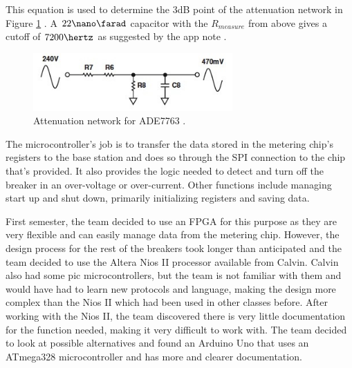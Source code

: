 This equation is used to determine the 3dB point of the attenuation network in Figure \ref{fig:attenuation_network} \cite{AN564}. A $22\nano\farad$ capacitor with the $R_{measure}$ from above gives a cutoff of $7200\hertz$ as suggested by the app note \cite{AN564}. 

\begin{figure}[htbp]
\begin{center}
\includegraphics[width=3in]{includes/NJAttenuationNetwork} 
\caption{Attenuation network for ADE7763 \cite{AN564}.}
\label{fig:attenuation_network} 
\end{center}
\end{figure}

The microcontroller's job is to transfer the data stored in the metering chip's registers to the base station and does so through the SPI connection to the chip that's provided. It also provides the logic needed to detect and turn off the breaker in an over-voltage or over-current.  Other functions include managing start up and shut down, primarily initializing registers and saving data. 

First semester, the team decided to use an FPGA for this purpose as they are very flexible and can easily manage data from the metering chip. However, the design process for the rest of the breakers took longer than anticipated and the team decided to use the Altera Nios II processor available from Calvin. Calvin also had some pic microcontrollers, but the team is not familiar with them and would have had to learn new protocols and language, making the design more complex than the Nios II which had been used in other classes before. After working with the Nios II, the team discovered there is very little documentation for the function needed, making it very difficult to work with. The team decided to look at possible alternatives and found an Arduino Uno that uses an ATmega328 microcontroller and has more and clearer documentation. 

